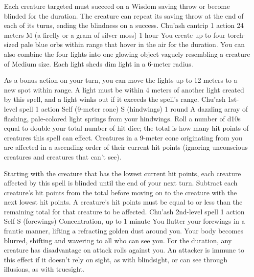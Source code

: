     Each creature targeted must succeed on a Wisdom saving throw or become blinded for the duration.
    The creature can repeat its saving throw at the end of each of its turns, ending the blindness on a success.
    {Chu'ash cantrip}
    {1 action}
    {24 meters}
    {M (a firefly or a gram of silver moss)}
    {1 hour}
    You create up to four torch-sized pale blue orbs within range that hover in the air for the duration.
    You can also combine the four lights into one glowing object vaguely resembling a creature of Medium size.
    Each light sheds dim light in a 6-meter radius.

    As a bonus action on your turn, you can move the lights up to 12 meters to a new spot within range.
    A light must be within 4 meters of another light created by this spell, and a light winks out if it exceeds the spell's range.
    {Chu'ash 1st-level spell}
    {1 action}
    {Self (9-meter cone)}
    {S (hindwings)}
    {1 round}
    A dazzling array of flashing, pale-colored light springs from your hindwings.
    Roll a number of d10s equal to double your total number of hit dice; the total is how many hit points of creatures this spell can effect.
    Creatures in a 9-meter cone originating from you are affected in a ascending order of their current hit points (ignoring unconscious creatures and creatures that can't see).

    Starting with the creature that has the lowest current hit points, each creature affected by this spell is blinded until the end of your next turn.
    Subtract each creature's hit points from the total before moving on to the creature with the next lowest hit points.
    A creature's hit points must be equal to or less than the remaining total for that creature to be affected.
    {Chu'ash 2nd-level spell}
    {1 action}
    {Self}
    {S (forewings)}
    {Concentration, up to 1 minute}
    You flutter your forewings in a frantic manner, lifting a refracting golden dust around you.
    Your body becomes blurred, shifting and wavering to all who can see you.
    For the duration, any creature has disadvantage on attack rolls against you.
    An attacker is immune to this effect if it doesn't rely on sight, as with blindsight, or can see through illusions, as with truesight.
